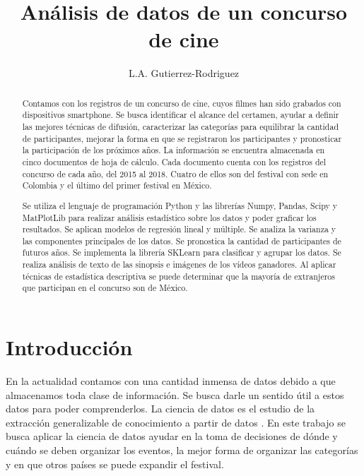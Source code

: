 \documentclass[5p,times]{elsarticle}
\begin{document}
\begin{frontmatter}

\title{Análisis de datos de un concurso de cine}
\author{L.A. Gutierrez-Rodriguez}
\address{Posgrado de Ingeniería en Sistemas,\\ Facultad de Ingeniería Mecánica y Eléctrica,\\ Universidad Autónoma de Nuevo León}

\begin{abstract}
Contamos con los registros de un concurso de cine, cuyos filmes han sido grabados con dispositivos smartphone. Se busca identificar el alcance del certamen, ayudar a definir las mejores técnicas de difusión, caracterizar las categorías para equilibrar la cantidad de participantes, mejorar la forma en que se registraron los participantes y pronosticar la participación de los próximos años. La información se encuentra almacenada en cinco documentos de hoja de cálculo. Cada documento cuenta con los registros del concurso de cada año, del 2015 al 2018. Cuatro de ellos son del festival con sede en Colombia y el último del primer festival en México.

Se utiliza el lenguaje de programación Python y las librerías Numpy, Pandas, Scipy y MatPlotLib para realizar análisis estadístico sobre los datos y poder graficar los resultados. Se aplican modelos de regresión lineal y múltiple. Se analiza la varianza y las componentes principales de los datos. Se pronostica la cantidad de participantes de futuros años. Se implementa la librería SKLearn para clasificar y agrupar los datos. Se realiza análisis de texto de las sinopsis e imágenes de los vídeos ganadores. Al aplicar técnicas de estadística descriptiva se puede determinar que la mayoría de extranjeros que participan en el concurso son de México. 



\end{abstract}

\end{frontmatter}

\renewcommand{\abstractname}{Resumen}

\section*{Introducción}
En la actualidad contamos con una cantidad inmensa de datos debido a que almacenamos toda clase de información. Se busca darle un sentido útil a estos datos para poder comprenderlos. La ciencia de datos es el estudio de la extracción generalizable de conocimiento a partir de datos \cite{dhar2012data}. En este trabajo se busca aplicar la ciencia de datos ayudar en la toma de decisiones de dónde y cuándo se deben organizar los eventos, la mejor forma de organizar las categorías y en que otros países se puede expandir el festival. 
\end{document}
